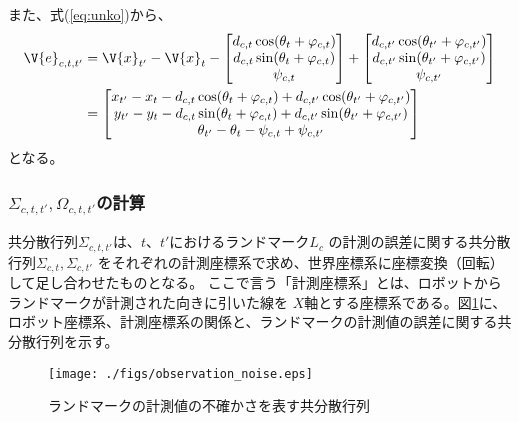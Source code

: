 また、式(\ref{eq:unko})から、
\begin{align}
	\V{e}_{c,t,t'} &= \V{x}_{t'} - \V{x}_t -
	\begin{bmatrix}
	d_{c,t} \cos(\theta_t + \varphi_{c,t}) \\
	d_{c,t} \sin(\theta_t + \varphi_{c,t}) \\
	\psi_{c,t}
	\end{bmatrix} 
	+ 
	\begin{bmatrix}
	d_{c,t'} \cos(\theta_{t'} + \varphi_{c,t'}) \\
	d_{c,t'} \sin(\theta_{t'} + \varphi_{c,t'}) \\
	\psi_{c,t'}
	\end{bmatrix} \nonumber \\
	&= 
	\begin{bmatrix}
		x_{t'} - x_t 
		- d_{c,t} \cos(\theta_{t} + \varphi_{c,t}) + d_{c,t'} \cos(\theta_{t'} + \varphi_{c,t'}) \\
		y_{t'} - y_t 
		- d_{c,t} \sin(\theta_{t} + \varphi_{c,t}) + d_{c,t'} \sin(\theta_{t'} + \varphi_{c,t'}) \\
		\theta_{t'} - \theta_t 
	- \psi_{c,t} + \psi_{c,t'}
	\end{bmatrix} \label{eq:e2}
\end{align}
となる。

\subsubsection{$\Sigma_{c,t,t'}, \Omega_{c,t,t'}$の計算}

共分散行列$\Sigma_{c,t,t'}$は、$t$、$t'$におけるランドマーク$L_c$
の計測の誤差に関する共分散行列$\Sigma_{c,t}, \Sigma_{c,t'}$
をそれぞれの計測座標系で求め、世界座標系に座標変換（回転）して足し合わせたものとなる。
ここで言う「計測座標系」とは、ロボットからランドマークが計測された向きに引いた線を
$X$軸とする座標系である。図\ref{fig:observation_noise}に、
ロボット座標系、計測座標系の関係と、ランドマークの計測値の誤差に関する共分散行列を示す。

\begin{figure}[htbp]
	\begin{center}
		\texttt{[image: ./figs/observation\_noise.eps]}
		\caption{ランドマークの計測値の不確かさを表す共分散行列}
		\label{fig:observation_noise}
	\end{center}
\end{figure}


